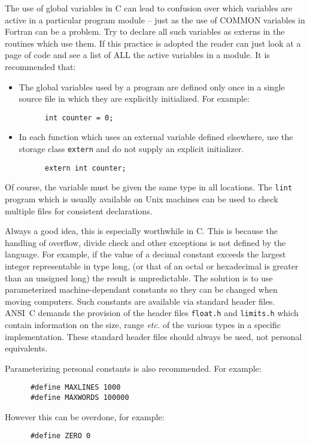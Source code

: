 The use of global variables in C can lead to confusion over which
variables are active in a particular program module --
just as the use of COMMON variables in Fortran can be a problem.
Try to declare  all such variables as externs in the routines which use them.
If this practice is adopted the reader can just look at a page of code 
and see a list of ALL the active variables in a module.
It is recommended that:
\begin{itemize}
\item The global variables used by a program are defined only once 
in a single source file  in which they are explicitly initialized.
For example:
\begin{verbatim}
      int counter = 0;
\end{verbatim}
\item In each function which uses an external variable defined elsewhere,
 use the storage class {\tt extern} and do not supply
an explicit initializer.
\begin{verbatim}
      extern int counter;
\end{verbatim}
\end{itemize}
Of course, the variable must be given the same type in all 
locations.
The {\tt lint} program which is usually available on Unix machines can be 
used to check multiple files for consistent declarations.


Always a good idea, this is especially worthwhile in C.
This is because the handling of overflow, divide check and 
other exceptions is not defined by the language.
For example, if the value of a decimal constant exceeds the largest integer 
representable in type long, (or that of an octal or hexadecimal is greater
than an unsigned long)
the result is unpredictable.
The solution is to use parameterized
machine-dependant constants so they can be changed when moving computers.
Such constants  are available via  standard header files.
ANSI~C demands the provision of the header files {\tt float.h} 
and {\tt limits.h} which contain information on the size, range {\it etc.} 
of the 
various types in a specific implementation. These standard 
header files should always be used, not personal equivalents.

Parameterizing personal constants is also recommended.
For example:
\begin{verbatim}
      #define MAXLINES 1000
      #define MAXWORDS 100000
\end{verbatim}
However this can be overdone, for example:
\begin{verbatim}
      #define ZERO 0
\end{verbatim}


